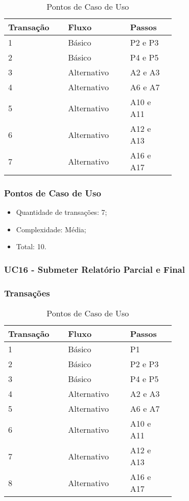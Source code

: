 \begin{table*}[!h]
\centering
\caption{Pontos de Caso de Uso}
\label{Rotulo}
  \begin{tabular}{|p{0.20\linewidth}|p{0.25\linewidth}|p{0.20\linewidth}|}
  \hline
  \textbf{Transação} & \textbf{Fluxo} & \textbf{Passos} \\ 
  \hline
  1 & Básico & P2 e P3\\
  \hline
  2 & Básico & P4 e P5\\
  \hline
  3 & Alternativo & A2 e A3\\
  \hline
  4 & Alternativo & A6 e A7\\
  \hline
  5 & Alternativo & A10 e A11\\
  \hline
  6 & Alternativo & A12 e A13\\
  \hline
  7 & Alternativo & A16 e A17\\
  \hline
  \end{tabular}
\end{table*}

\pagebreak
\subsubsection{Pontos de Caso de Uso}

\begin{itemize}
 \item Quantidade de transações: 7;
 \item Complexidade: Média;
 \item Total: 10.
\end{itemize}

\subsubsection{UC16 - Submeter Relatório Parcial e Final}

\subsubsection{Transações}

\begin{table*}[!h]
\centering
\caption{Pontos de Caso de Uso}
\label{Rotulo}
  \begin{tabular}{|p{0.20\linewidth}|p{0.25\linewidth}|p{0.20\linewidth}|}
  \hline
  \textbf{Transação} & \textbf{Fluxo} & \textbf{Passos} \\ 
  \hline
  1 & Básico & P1\\
  \hline
  2 & Básico & P2 e P3\\
  \hline
  3 & Básico & P4 e P5\\
  \hline
  4 & Alternativo & A2 e A3\\
  \hline
  5 & Alternativo & A6 e A7\\
  \hline
  6 & Alternativo & A10 e A11\\
  \hline
  7 & Alternativo & A12 e A13\\
  \hline
  8 & Alternativo & A16 e A17\\
  \hline
  \end{tabular}
\end{table*}

